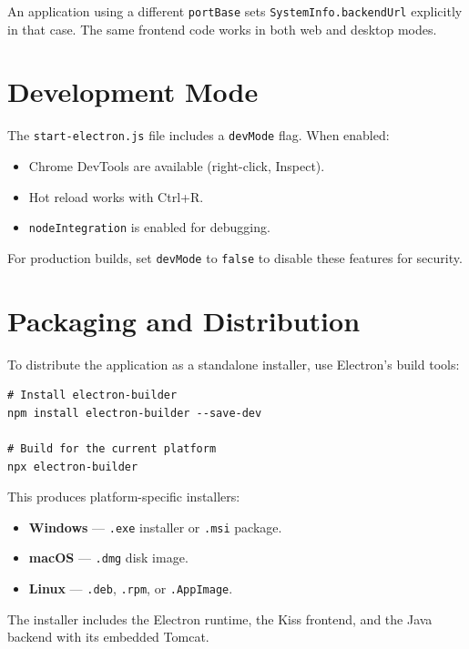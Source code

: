 \noindent
An application using a different \texttt{portBase} sets \texttt{SystemInfo.backendUrl} explicitly in that case.  The same frontend code works in both web and desktop modes.

\section{Development Mode}
\label{sec:desk-devmode}

The \texttt{start-electron.js} file includes a \texttt{devMode} flag.  When enabled:

\begin{itemize}
  \item Chrome DevTools are available (right-click, Inspect).
  \item Hot reload works with Ctrl+R.
  \item \texttt{nodeIntegration} is enabled for debugging.
\end{itemize}

\noindent
For production builds, set \texttt{devMode} to \texttt{false} to disable these features for security.

\section{Packaging and Distribution}
\label{sec:desk-packaging}

To distribute the application as a standalone installer, use Electron's build tools:

\begin{lstlisting}[style=shell]
# Install electron-builder
npm install electron-builder --save-dev

# Build for the current platform
npx electron-builder
\end{lstlisting}

\noindent
This produces platform-specific installers:
\begin{itemize}
  \item \textbf{Windows} --- \texttt{.exe} installer or \texttt{.msi} package.
  \item \textbf{macOS} --- \texttt{.dmg} disk image.
  \item \textbf{Linux} --- \texttt{.deb}, \texttt{.rpm}, or \texttt{.AppImage}.
\end{itemize}

\noindent
The installer includes the Electron runtime, the Kiss frontend, and the Java backend with its embedded Tomcat.

